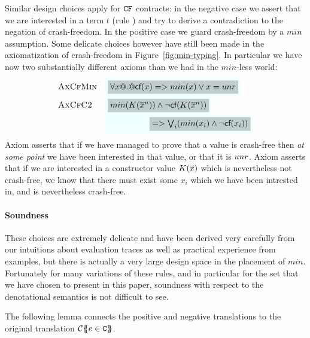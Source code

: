 Similar design choices apply for ${\tt CF}$ contracts: in the negative case we assert that we are interested
in a term $t$ (rule ) and try to derive a contradiction to the negation of crash-freedom.
In the positive case we guard crash-freedom by a $min$ assumption. Some delicate choices however have still
been made in the axiomatization of crash-freedom in Figure~\ref{fig:min-typing}. In particular we have now
two substantially different axioms than we had in the $min$-less world:
\[\begin{array}{lll} 
 \textsc{AxCfMin} & \formula{\highlight{\forall x @.@ \lcf{x} => min(x) \lor x = unr}} \\
 \textsc{AxCfC2} & \formula{\highlight{min(K(\oln{x}{n}))\land\neg\lcf{K(\oln{x}{n})}}} \\ 
                 & \formula{\quad\qquad\qquad \highlight{ => \bigvee_i (min(x_i)\land\neg\lcf{x_i})}}
\end{array}\]
Axiom  asserts that if we have managed to prove that a value is crash-free 
then {\em at some point} we have been interested in that value, or that it is $\mathop{unr}$. Axiom 
 asserts that if we are interested in a constructor value $K(\overline{x})$ which is 
nevertheless not crash-free, we know that there must exist some $x_i$ which we have been intrested 
in, and is nevertheless crash-free.

\paragraph{Soundness}
These choices are extremely delicate and have been derived very carefully from our intuitions about 
evaluation traces as well as practical experience from examples, but there is actually a very large 
design space in the placement of $min$. Fortunately for many variations of these rules, and in particular
for the set that we have chosen to present in this paper, soundness with respect to the denotational 
semantics is not difficult to see. 

The following lemma connects the positive and negative translations to 
the original translation ${\cal C}\{\!\!\{e \in {\tt C}\}\!\!\}$. 

